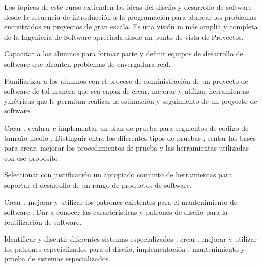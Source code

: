 \begin{syllabus}


\begin{justification}
Los tópicos de este curso extienden las ideas del diseño y desarrollo de software desde la secuencia de introducción
a la programación para abarcar los problemas encontrados en proyectos de gran escala. Es una visión m más amplia y
completa de la Ingeniería de Software apreciada desde un punto de vista de Proyectos.
\end{justification}

\begin{goals}
    \item Capacitar a los alumnos para formar parte y definir equipos de desarrollo de software que afronten problemas de envergadura real.
    \item Familiarizar a los alumnos con el proceso de administración de un proyecto de software de tal manera que sea capaz de crear, mejorar y utilizar herramientas ymétricas que  le permitan realizar la estimación y seguimiento de un proyecto de software.
    \item Crear , evaluar e implementar un plan de prueba para segmentos de código de tamaño medio , Distinguir entre los diferentes tipos de pruebas , sentar las bases para crear, mejorar los procedimientos de prueba y las herramientas utilizadas con ese propósito.
    \item Seleccionar con justificación un apropiado conjunto de herramientas para soportar el desarrollo de un rango de productos de software.
    \item Crear , mejorar y utilizar los patrones existentes para el mantenimiento de software . Dar a conocer las características y patrones de diseño para la reutilización de software.
    \item Identificar y discutir diferentes sistemas especializados , crear , mejorar y utilizar los patrones especializados para el diseño, implementación , mantenimiento y prueba de sistemas especializados.
\end{goals}

\begin{outcomes}
    \item {}
    \item {}
	\item {}
	\item {}
	\item {}
\end{outcomes}


\end{syllabus}
